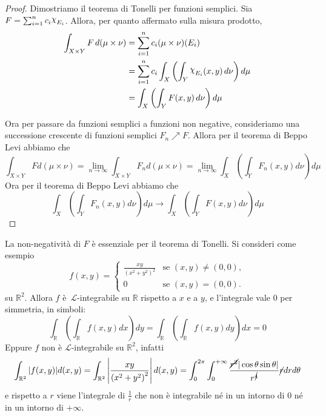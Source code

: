 \begin{proof}
    Dimostriamo il teorema di Tonelli per funzioni semplici. Sia \(F = \sum_{i=1}^{n}
    c_{i} \rchi_{E_i}\). Allora, per quanto affermato sulla misura prodotto,
    \[
        \begin{aligned}
            \int_{X \times Y} F \, d(\mu \times \nu) 
            &= \sum_{i=1}^{n} c_{i} (\mu \times \nu )(E_i) \\
            &= \sum_{i=1}^{n} c_{i} \int_X \left( \int_Y \rchi_{E_{i}}(x, y) \, d\nu \right) d\mu \\
            &= \int_X \left( \int_Y F(x, y) \, d\nu \right) d\mu
        \end{aligned}
    \]

    Ora per passare da funzioni semplici a funzioni non negative, consideriamo
    una successione crescente di funzioni semplici \(F_{n} \nearrow F\). Allora
    per il teorema di Beppo Levi abbiamo che
    \[
        \int_{X \times Y} F d(\mu \times \nu) = \lim_{n \to \infty} \int_{X
        \times Y} F_{n} d(\mu \times \nu) = \lim_{n \to \infty} \int_X \left(
        \int_Y F_{n}(x,y) d\nu \right) d\mu
    \]
    Ora per il teorema di Beppo Levi abbiamo che
    \[
        \int_X \left( \int_Y F_{n}(x,y) d\nu \right) d\mu \to \int_X \left(
        \int_Y F(x,y) d\nu \right) d\mu
    \]
\end{proof}
\begin{remark}
    La non-negatività di \(F\) è essenziale per il teorema di Tonelli. Si
    consideri come esempio
    \[
    f(x, y) =
    \begin{cases} 
    \displaystyle \frac{xy}{{\left( x^2 + y^2 \right)}^2} & \text{se } (x, y) \neq (0, 0), \\[10pt]
    0 & \text{se } (x, y) = (0, 0).
    \end{cases}
    \]
    su \(\mathbb{R}^2\). Allora \(f\) è~\(\mathcal{L}\)-integrabile su \(\mathbb{R}\) rispetto a \(x\) e a \(y\), e l'integrale
    vale 0 per simmetria, in simboli:
    \[
        \int_{\mathbb{R}} \left( \int_{\mathbb{R}} f(x, y) dx \right) dy = 
        \int_{\mathbb{R}} \left( \int_{\mathbb{R}} f(x, y) dy \right) dx = 0 
    \]
    Eppure \(f\) non è \(\mathcal{L}\)-integrabile su \(\mathbb{R}^2\), infatti
    \[
        \int_{\mathbb{R}^2} |f(x, y)| d(x, y) = \int_{\mathbb{R}^2}\left| \frac{xy}{{\left(
        x^2 + y^2 \right)}^2} \right|d(x, y) = \int_{0}^{2\pi} \int_{0}^{+\infty}
        \frac{\cancel{r^2} |\cos \theta \sin \theta|}{r^{\cancel{4}}} \cancel{r}dr d\theta
    \]
    e rispetto a \(r\) viene l'integrale di \(\frac{1}{r}\) che non è
    integrabile né in un intorno di \(0\) né in un intorno di \(+\infty\).
\end{remark}
